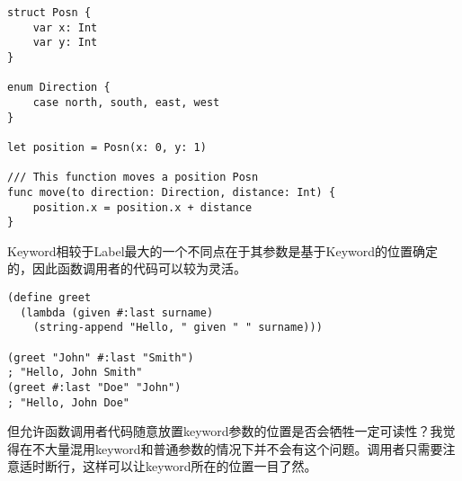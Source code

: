 \documentclass[11pt]{article}
\begin{document}
\begin{verbatim}
struct Posn {
    var x: Int
    var y: Int
}

enum Direction {
    case north, south, east, west
}

let position = Posn(x: 0, y: 1)

/// This function moves a position Posn
func move(to direction: Direction, distance: Int) {
    position.x = position.x + distance
}
\end{verbatim}

Keyword相较于Label最大的一个不同点在于其参数是基于Keyword的位置确定的，因此函数调用者的代码可以较为灵活。

\begin{verbatim}
(define greet
  (lambda (given #:last surname)
    (string-append "Hello, " given " " surname)))

(greet "John" #:last "Smith")
; "Hello, John Smith"
(greet #:last "Doe" "John")
; "Hello, John Doe"
\end{verbatim}

但允许函数调用者代码随意放置keyword参数的位置是否会牺牲一定可读性？我觉得在不大量混用keyword和普通参数的情况下并不会有这个问题。调用者只需要注意适时断行，这样可以让keyword所在的位置一目了然。
\end{document}
